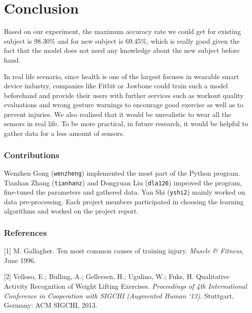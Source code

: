 \documentclass{article} %
\begin{document}
%

\section{Conclusion}

Based on our experiment, the maximum accuracy rate we could get for existing subject is 98.30\% and for new subject is 69.45\%, which is really good given the fact that the model does not need any knowledge about the new subject before hand.

In real life scenario, since health is one of the largest focuses in wearable smart device industry, companies like Fitbit or Jawbone could train such a model beforehand and provide their users with further services such as workout quality evaluations and wrong gesture warnings to encourage good exercise as well as to prevent injuries. We also realized that it would be unrealistic to wear all the sensors in real life. To be more practical, in future research, it would be helpful to gather data for a less amount of sensors.

\subsubsection*{Contributions}

Wenzhen Gong (\texttt{wenzheng}) implemented the most part of the Python program. Tianhan Zhang (\texttt{tianhanz}) and Dongyuan Liu (\texttt{dla126}) improved the program, fine-tuned the parameters and gathered data. Yan Shi (\texttt{yshi2}) mainly worked on data pre-processing. Each project members participated in choosing the learning algorithms and worked on the project report.

\subsubsection*{References}

\small{
[1] M. Gallagher. Ten most common causes of training injury. {\it Muscle \& Fitness}, June 1996.

[2] Velloso, E.; Bulling, A.; Gellersen, H.; Ugulino, W.; Fuks, H. Qualitative Activity Recognition of Weight Lifting Exercises. {\it Proceedings of 4th International Conference in Cooperation with SIGCHI (Augmented Human `13)}. Stuttgart, Germany: ACM SIGCHI, 2013.
}
\end{document}
